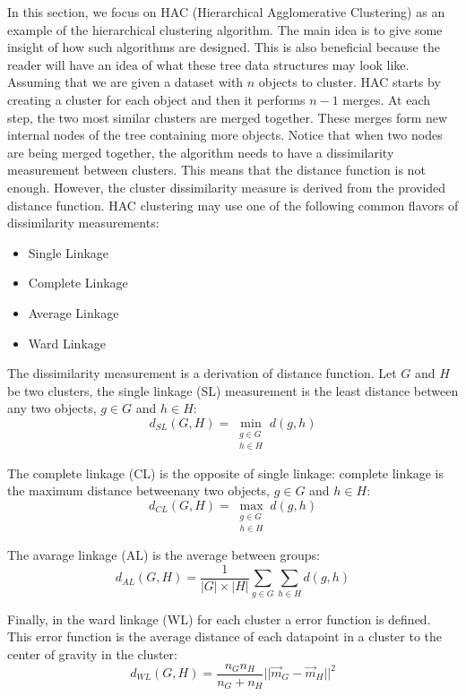 \documentclass[a4paper, 12pt]{article}
\begin{document}
In this section, we focus on HAC (Hierarchical Agglomerative Clustering) as an example of the hierarchical clustering algorithm. The main idea is to give some insight of how such algorithms are designed. This is also beneficial because the reader will have an idea of what these tree data structures may look like. Assuming that we are given a dataset with $n$ objects to cluster. HAC starts by creating a cluster for each object and then it performs $n - 1$ merges. At each step, the two most similar clusters are merged together. These merges form new internal nodes of the tree containing more objects. Notice that when two nodes are being merged together, the algorithm needs to have a dissimilarity measurement between clusters. This means that the distance function is not enough. However, the cluster dissimilarity measure is derived from the provided distance function. HAC clustering may use one of the following common flavors of dissimilarity measurements:
\begin{itemize}
    \item Single Linkage
    \item Complete Linkage
    \item Average Linkage
    \item Ward Linkage
\end{itemize}

The dissimilarity measurement is a derivation of distance function. Let $G$ and $H$ be two clusters, the single linkage (SL) measurement is the least distance between any two objects, $g \in G$ and $h \in H$:
\begin{equation} \label{eq14}
    d_{SL}(G, H) = \min_{\substack{g \in G \\ h \in H}}d(g,h)
\end{equation}

The complete linkage (CL) is the opposite of single linkage: complete linkage is the maximum distance betweenany two objects, $g \in G$ and $h \in H$:
\begin{equation} \label{eq15}
    d_{CL}(G, H) = \max_{\substack{g \in G \\ h \in H}}d(g,h)
\end{equation}

The avarage linkage (AL) is the average between groups:
\begin{equation} \label{eq16}
    d_{AL}(G, H) = \frac{1}{|G| \times |H|}\sum_{g \in G}\sum_{h \in H}d(g,h)
\end{equation}

Finally, in the ward linkage (WL) for each cluster a error function is defined. This error function is the average distance of each datapoint in a cluster to the center of gravity in the cluster:
\begin{equation} \label{eq17}
    d_{WL}(G, H) = \frac{n_Gn_H}{n_G + n_H}||\vec{m}_G - \vec{m}_H||^2
\end{equation}
\end{document}
